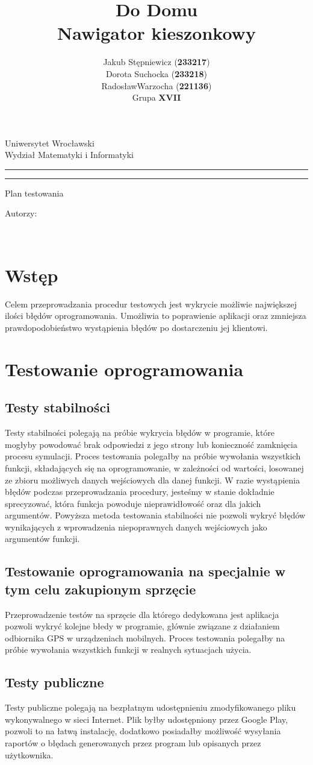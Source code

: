 \documentclass[12pt,a4paper]{article}
\author{Jakub Stępniewicz (\textbf{233217})\\Dorota Suchocka (\textbf{233218})\\ RadosławWarzocha (\textbf{221136})\\Grupa {\bf XVII}}
\title{Do Domu\\ \small{Nawigator kieszonkowy}}
\makeatletter
\newcommand{\linia}{\rule{\linewidth}{0.4mm}}
\renewcommand{\maketitle}{\begin{titlepage}
		\vspace*{1cm}
    \begin{center}\small
    	Uniwersytet Wrocławski\\
    	Wydział Matematyki i Informatyki\\
    \end{center}
    \vspace{3cm}
    \noindent
    \linia
    \begin{center}
    	\LARGE{\textsc{\@title}}
         \end{center}
     \linia
    \begin{center}
    	\Large{Plan testowania}
         \end{center}
    \vspace{0.5cm}

    \begin{flushright}

    \begin{minipage}{5.5cm}

    	\small Autorzy:

    \normalsize {\@author} \par
    

    \end{minipage}
    \vspace{5cm}

     

     \end{flushright}

    \vspace*{\stretch{6}}

    \begin{center}

    \@date\\

    \end{center}

  \end{titlepage}%

}
\makeatother
\begin{document}
\maketitle
\tableofcontents
\vspace{5cm}

\newpage
% 
\section{Wstęp}
Celem przeprowadzania procedur testowych jest wykrycie możliwie największej ilości błędów 
oprogramowania. Umożliwia to poprawienie aplikacji oraz zmniejsza prawdopodobieństwo wystąpienia błędów po dostarczeniu jej klientowi.

\section{Testowanie oprogramowania}
\subsection{Testy stabilności}
Testy stabilności polegają na próbie wykrycia błędów w programie, które mogłyby powodować brak 
odpowiedzi z jego strony lub konieczność zamknięcia procesu symulacji. Proces testowania polegałby 
na próbie wywołania wszystkich funkcji, składających się na oprogramowanie, w zależności 
od wartości, losowanej ze zbioru możliwych danych wejściowych dla danej funkcji. W razie wystąpienia 
błędów podczas przeprowadzania procedury, jesteśmy w stanie dokładnie sprecyzować, która funkcja 
powoduje nieprawidłowość oraz dla jakich argumentów. Powyższa metoda testowania stabilności nie 
pozwoli wykryć błędów wynikających z wprowadzenia niepoprawnych danych wejściowych jako argumentów 
funkcji.

\subsection{Testowanie oprogramowania na specjalnie w tym celu zakupionym sprzęcie}
Przeprowadzenie testów na sprzęcie dla którego dedykowana jest aplikacja pozwoli wykryć kolejne błedy w programie, głównie związane z działaniem odbiornika GPS w urządzeniach mobilnych. Proces testowania polegałby na próbie wywołania wszystkich funkcji w realnych sytuacjach użycia. 


\subsection{Testy publiczne}
Testy publiczne polegają na bezpłatnym udostępnieniu zmodyfikowanego pliku wykonywalnego w sieci 
Internet. Plik byłby udostępniony przez Google Play, pozwoli to na łatwą instalację, dodatkowo posiadałby możliwość wysyłania raportów o błędach generowanych przez program lub opisanych przez użytkownika.
\end{document}
